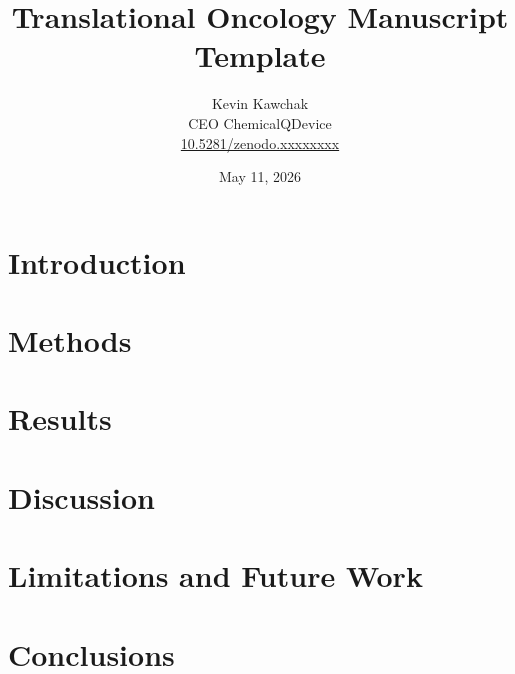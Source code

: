 \documentclass[11pt]{article}
\title{Translational Oncology Manuscript Template}
\author{
  Kevin Kawchak\hspace{2pt}\orcidicon{0009-0007-5457-8667} \\
  CEO ChemicalQDevice\\
  \href{https://doi.org/10.5281/zenodo.xxxxxxxx}{10.5281/zenodo.xxxxxxxx} \\
}
\date{May 11, 2026}
\begin{document}
\maketitle

\begin{abstract}

\end{abstract}

\keywords{ }

\vspace{-0.2cm}

\section{Introduction}
\label{sec:introduction}


\tableofcontents
\vspace{0.4cm}

\newpage
\section{Methods}
\label{sec:methods}

\newpage

\section{Results}
\label{sec:results}

\newpage

\section{Discussion}
\label{sec:discussion}


\section{Limitations and Future Work}
\label{sec:limitations}

\newpage

\section{Conclusions}
\label{sec:conclusions}

\newpage

{}
\begingroup
\raggedright


\endgroup
\newpage


\end{document}
